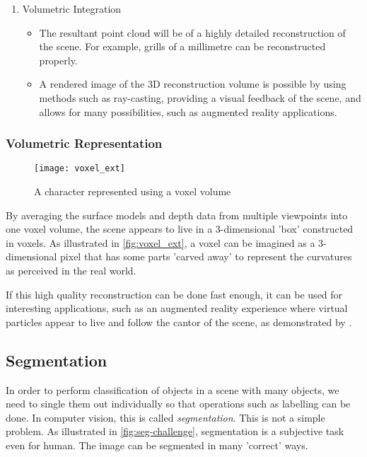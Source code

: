 \begin{enumerate}
  \item Volumetric Integration
    \begin{itemize}
      \item The resultant point cloud will be of a highly detailed reconstruction of the scene. For example, grills of a millimetre \cite{ms-3d-paper} can be reconstructed properly.
      \item A rendered image of the 3D reconstruction volume is possible by using methods such as ray-casting, providing a visual feedback of the scene, and allows for many possibilities, such as augmented reality applications.
    \end{itemize}
\end{enumerate}


\subsubsection{Volumetric Representation}

\begin{figure}[h]
  \centering
  \texttt{[image: voxel\_ext]}
  \caption[caption]{A character represented using a voxel volume\protect\footnotemark}
  \label{fig:voxel_ext}
\end{figure}

By averaging the surface models and depth data from multiple viewpoints into one voxel volume, the scene appears to live in a 3-dimensional 'box' constructed in voxels. As illustrated in \autoref{fig:voxel_ext}, a voxel can be imagined as a 3-dimensional pixel that has some parts 'carved away' to represent the curvatures as perceived in the real world.\cite{szeliski-book}

If this high quality reconstruction can be done fast enough, it can be used for interesting applications, such as an augmented reality experience where virtual particles appear to live and follow the cantor of the scene, as demonstrated by . 

\subsection{Segmentation}
In order to perform classification of objects in a scene with many objects, we need to single them out individually so that operations such as labelling can be done. In computer vision, this is called \textit{segmentation}. This is not a simple problem. As illustrated in \autoref{fig:seg-challenge}, segmentation is a subjective task even for human. The image can be segmented in many 'correct' ways.

